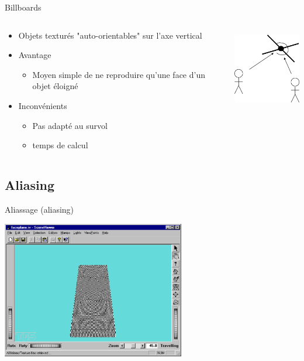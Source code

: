\begin{frame}[t]{Billboards}
  \begin{columns}
\begin{column}{.49\textwidth}
  \begin{itemize}
    \item Objets texturés "auto-orientables" sur l'axe vertical
    \item Avantage
    \begin{itemize}
      \item Moyen simple de ne reproduire qu'une face d'un objet éloigné
    \end{itemize}
    \item Inconvénients
    \begin{itemize}
      \item Pas adapté au survol
      \item temps de calcul
    \end{itemize}
  \end{itemize}
\end{column}
\begin{column}{.49\textwidth}
\begin{center}
  \includegraphics[height=3.5cm]{figs/billboard.png}
\end{center}
\end{column}
  \end{columns}
\end{frame}
\subsection{Aliasing}

\begin{frame}[t]{Aliassage (aliasing)}
  \begin{center}
    \includegraphics[height=6cm]{figs/alias1.png}
  \end{center}
\end{frame}

